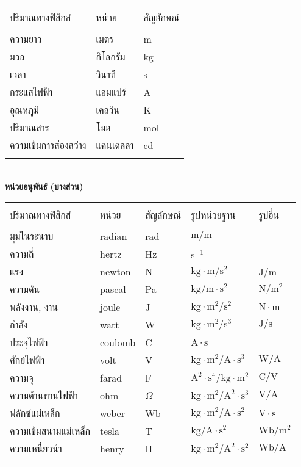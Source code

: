 \begin{tabular}[!ht]{lll}
\hline\\
ปริมาณทางฟิสิกส์&หน่วย&สัญลักษณ์\\
\hline\\
ความยาว&เมตร& m\\
มวล&กิโลกรัม&kg\\
เวลา&วินาที&s\\
กระแสไฟฟ้า&แอมแปร์&A\\
อุณหภูมิ&เคลวิน&K\\
ปริมาณสาร&โมล&mol\\
ความเข้มการส่องสว่าง&แคนเดลลา&cd\\\\
\hline
\end{tabular}\\


\noindent\textbf{หน่วยอนุพันธ์ (บางส่วน)}

\begin{tabular}[!ht]{lllll}
\hline\\
ปริมาณทางฟิสิกส์&หน่วย&สัญลักษณ์&รูปหน่วยฐาน&รูปอื่น\\
\hline\\
มุมในระนาบ&radian&rad&$\mathrm{m}/\mathrm{m}$&\\
ความถี่&hertz&Hz&$\mathrm{s}^{-1}$&\\
แรง&newton&N&$\mathrm{kg}\cdot\mathrm{m}/\mathrm{s}^2$&J/m\\
ความดัน&pascal&Pa&$\mathrm{kg}/\mathrm{m}\cdot\mathrm{s}^2$&$\mathrm{N}/\mathrm{m}^2$\\
พลังงาน, งาน&joule&J&$\mathrm{kg}\cdot\mathrm{m}^2/\mathrm{s}^2$&$\mathrm{N}\cdot\mathrm{m}$\\
กำลัง&watt&W&$\mathrm{kg}\cdot\mathrm{m}^2/\mathrm{s}^3$&$\mathrm{J}/\mathrm{s}$\\
ประจุไฟฟ้า&coulomb&C&$\mathrm{A}\cdot\mathrm{s}$&\\
ศักย์ไฟฟ้า&volt&V&$\mathrm{kg}\cdot\mathrm{m}^2/\mathrm{A}\cdot\mathrm{s}^3$&$\mathrm{W}/\mathrm{A}$\\
ความจุ&farad&F&$\mathrm{A}^2\cdot\mathrm{s}^4/\mathrm{kg}\cdot\mathrm{m}^2$&$\mathrm{C}/\mathrm{V}$\\
ความต้านทานไฟฟ้า&ohm&$\Omega$&$\mathrm{kg}\cdot\mathrm{m}^2/\mathrm{A}^2\cdot\mathrm{s}^3$&$\mathrm{V}/\mathrm{A}$\\
ฟลักซ์แม่เหล็ก&weber&Wb&$\mathrm{kg}\cdot\mathrm{m}^2/\mathrm{A}\cdot\mathrm{s}^2$&$\mathrm{V}\cdot\mathrm{s}$\\
ความเข้มสนามแม่เหล็ก&tesla&T&$\mathrm{kg}/\mathrm{A}\cdot\mathrm{s}^2$&$\mathrm{Wb}/\mathrm{m}^2$\\
ความเหนี่ยวนำ&henry&H&$\mathrm{kg}\cdot\mathrm{m}^2/\mathrm{A}^2\cdot\mathrm{s}^2$&$\mathrm{Wb}/\mathrm{A}$\\\\
\hline
\end{tabular} 


